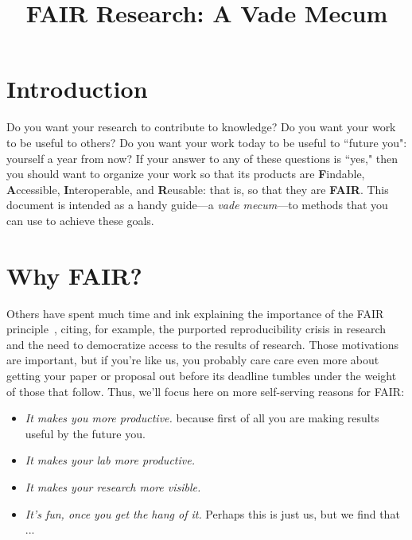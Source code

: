 \documentclass[11pt]{article}
\newcommand\ian[1]{}
\newcommand\ian[1]{{\color{red}[Ian: #1]}}
\begin{document}
\title{FAIR Research: A Vade Mecum}
\author{}
\date{}
\maketitle

\section{Introduction}

Do you want your research to contribute to knowledge?
Do you want your work to be useful to others?
Do you want your work today to be useful to ``future you": yourself a year from now?
If your answer to any of these questions is ``yes," 
then you should want to organize your work so that its products are
\textbf{F}indable, \textbf{A}ccessible, \textbf{I}nteroperable, and \textbf{R}eusable: 
that is, so that they are \textbf{FAIR}.
This document is intended as a handy guide---a \emph{vade mecum}---to  
methods that you can use to achieve these goals.

\ian{A few lines of philosophy: simple, straightforward, informal.... no best way for all people and 
all circumstances, but simple methods that can be make a difference. (Need to circumscribe to computational somehow?)}


\section{Why FAIR?}

Others have spent much time and ink explaining the importance of the FAIR principle~\cite{wilkinson16},
citing, for example, the purported reproducibility crisis in research and the need to democratize access to the
results of research. 
Those motivations are important, but if you're like us, 
you probably care care even more about getting your paper or proposal out before its deadline tumbles under the weight of those that follow. 
Thus, we'll focus here on more self-serving reasons for FAIR:


\begin{itemize}
\item
\emph{It makes you more productive.}
 because first of all you are making results useful by the future you.

\item
\emph{It makes your lab more productive.} 

\item
\emph{It makes your research more visible.}

\item
\emph{It's fun, once you get the hang of it.} 
Perhaps this is just us, but we find that ...
\end{itemize}
\end{document}

